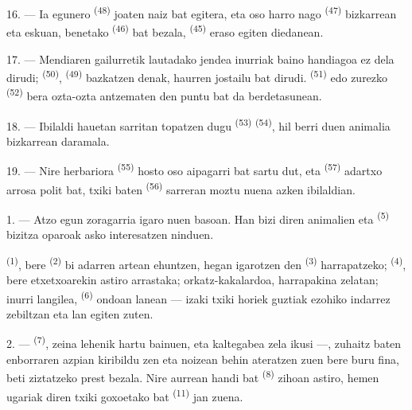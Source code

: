 \VUsaut{3.0mm}

16. --- Ia egunero  \textsuperscript{(48)} joaten naiz
 bat egitera, eta oso harro nago 
\textsuperscript{(47)} bizkarrean eta  eskuan, benetako
 \textsuperscript{(46)} bat bezala, 
\textsuperscript{(45)} eraso egiten diedanean.

17. --- Mendiaren gailurretik lautadako jendea inurriak baino handiagoa ez dela
dirudi;  \textsuperscript{(50)}, 
\textsuperscript{(49)} bazkatzen denak, haurren jostailu bat dirudi. 
\textsuperscript{(51)} edo zurezko  \textsuperscript{(52)} bera
ozta-ozta antzematen den puntu bat da berdetasunean.

18. --- Ibilaldi hauetan sarritan topatzen dugu 
\textsuperscript{(53)}  \textsuperscript{(54)}, hil
berri duen animalia bizkarrean daramala.

19. --- Nire herbariora  \textsuperscript{(55)} hosto oso
aipagarri bat sartu dut, eta  \textsuperscript{(57)}
adartxo arrosa polit bat,  txiki baten \textsuperscript{(56)}
sarreran moztu nuena azken ibilaldian.

\VUsaut{3.0mm}
\VUsaut{3.0mm}

\VUsaut{3.0mm}

1. --- Atzo egun zoragarria igaro nuen basoan. Han bizi diren animalien eta
 \textsuperscript{(5)} bizitza oparoak asko interesatzen
ninduen.

 \textsuperscript{(1)}, bere 
\textsuperscript{(2)} bi adarren artean ehuntzen, hegan igarotzen den
 \textsuperscript{(3)} harrapatzeko; 
\textsuperscript{(4)}, bere etxetxoarekin astiro arrastaka; orkatz-kakalardoa,
harrapakina zelatan; inurri langilea, 
\textsuperscript{(6)} ondoan lanean --- izaki txiki horiek guztiak ezohiko indarrez
zebiltzan eta lan egiten zuten.

2. ---  \textsuperscript{(7)}, zeina lehenik 
hartu bainuen, eta  kaltegabea zela ikusi ---, zuhaitz baten
enborraren azpian kiribildu zen eta noizean behin ateratzen zuen bere buru fina,
beti ziztatzeko prest bezala. Nire aurrean  handi bat
\textsuperscript{(8)} zihoan astiro, hemen ugariak diren  txiki
goxoetako bat \textsuperscript{(11)} jan zuena.

